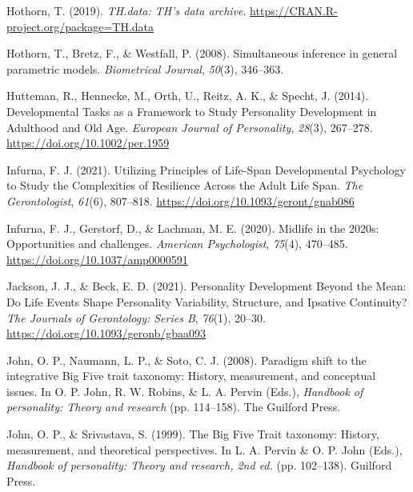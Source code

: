 \documentclass[
  english,
  man,floatsintext]{apa7}
\begin{document}
\leavevmode\hypertarget{ref-R-TH.data}{}%
Hothorn, T. (2019). \emph{TH.data: TH's data archive}. \url{https://CRAN.R-project.org/package=TH.data}

\leavevmode\hypertarget{ref-R-multcomp}{}%
Hothorn, T., Bretz, F., \& Westfall, P. (2008). Simultaneous inference in general parametric models. \emph{Biometrical Journal}, \emph{50}(3), 346--363.

\leavevmode\hypertarget{ref-huttemanDevelopmentalTasksFramework2014}{}%
Hutteman, R., Hennecke, M., Orth, U., Reitz, A. K., \& Specht, J. (2014). Developmental Tasks as a Framework to Study Personality Development in Adulthood and Old Age. \emph{European Journal of Personality}, \emph{28}(3), 267--278. \url{https://doi.org/10.1002/per.1959}

\leavevmode\hypertarget{ref-infurnaUtilizingPrinciplesLifeSpan2021}{}%
Infurna, F. J. (2021). Utilizing Principles of Life-Span Developmental Psychology to Study the Complexities of Resilience Across the Adult Life Span. \emph{The Gerontologist}, \emph{61}(6), 807--818. \url{https://doi.org/10.1093/geront/gnab086}

\leavevmode\hypertarget{ref-infurnaMidlife2020sOpportunities2020}{}%
Infurna, F. J., Gerstorf, D., \& Lachman, M. E. (2020). Midlife in the 2020s: Opportunities and challenges. \emph{American Psychologist}, \emph{75}(4), 470--485. \url{https://doi.org/10.1037/amp0000591}

\leavevmode\hypertarget{ref-jacksonPersonalityDevelopmentMean2021}{}%
Jackson, J. J., \& Beck, E. D. (2021). Personality Development Beyond the Mean: Do Life Events Shape Personality Variability, Structure, and Ipsative Continuity? \emph{The Journals of Gerontology: Series B}, \emph{76}(1), 20--30. \url{https://doi.org/10.1093/geronb/gbaa093}

\leavevmode\hypertarget{ref-johnParadigmShiftIntegrative2008}{}%
John, O. P., Naumann, L. P., \& Soto, C. J. (2008). Paradigm shift to the integrative Big Five trait taxonomy: History, measurement, and conceptual issues. In O. P. John, R. W. Robins, \& L. A. Pervin (Eds.), \emph{Handbook of personality: Theory and research} (pp. 114--158). The Guilford Press.

\leavevmode\hypertarget{ref-johnBigFiveTrait1999}{}%
John, O. P., \& Srivastava, S. (1999). The Big Five Trait taxonomy: History, measurement, and theoretical perspectives. In L. A. Pervin \& O. P. John (Eds.), \emph{Handbook of personality: Theory and research, 2nd ed.} (pp. 102--138). Guilford Press.
\end{document}
